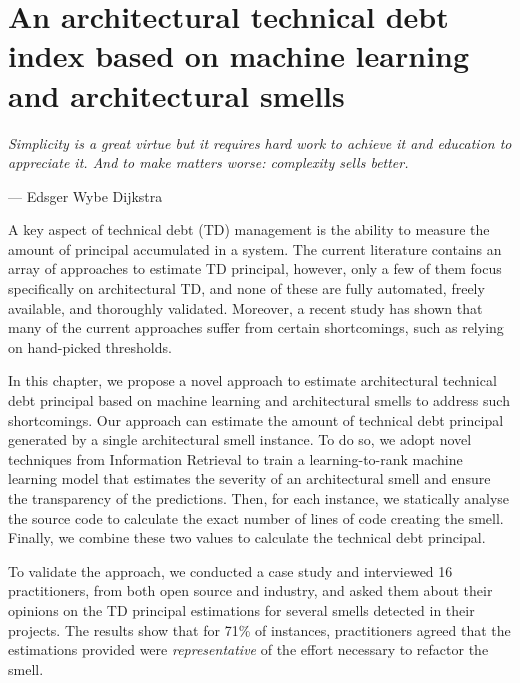 \setlength{\headheight}{1.2cm}
\renewcommand{\publ}{\flushleft\footnotesize{This chapter has been submitted to a journal.\\[0.1cm]}}

\chapter{An architectural technical debt index based on machine learning and architectural smells}
\label{chap:6}
\epigraph{\emph{Simplicity is a great virtue but it requires hard work to achieve it and education to appreciate it. And to make matters worse: complexity sells better.}}{--- Edsger Wybe Dijkstra}

\begin{Abstract}
	A key aspect of technical debt (TD) management is the ability to measure the amount of principal accumulated in a system.
    The current literature contains an array of approaches to estimate TD principal, however, only a few of them focus specifically on architectural TD, and none of these are fully automated, freely available, and thoroughly validated.
    Moreover, a recent study has shown that many of the current approaches suffer from certain shortcomings, such as relying on hand-picked thresholds.
    
    In this chapter, we propose a novel approach to estimate architectural technical debt principal based on machine learning and architectural smells to address such shortcomings.
    Our approach can estimate the amount of technical debt principal generated by a single architectural smell instance.
    To do so, we adopt novel techniques from Information Retrieval to train a learning-to-rank machine learning model that estimates the severity of an architectural smell and ensure the transparency of the predictions.
    Then, for each instance, we statically analyse the source code to calculate the exact number of lines of code creating the smell.
    Finally, we combine these two values to calculate the technical debt principal.
    
    To validate the approach, we conducted a case study and interviewed 16 practitioners, from both open source and industry, and asked them about their opinions on the TD principal estimations for several smells detected in their projects.
    The results show that for 71\% of instances, practitioners agreed that the estimations provided were \emph{representative} of the effort necessary to refactor the smell.
\end{Abstract}

